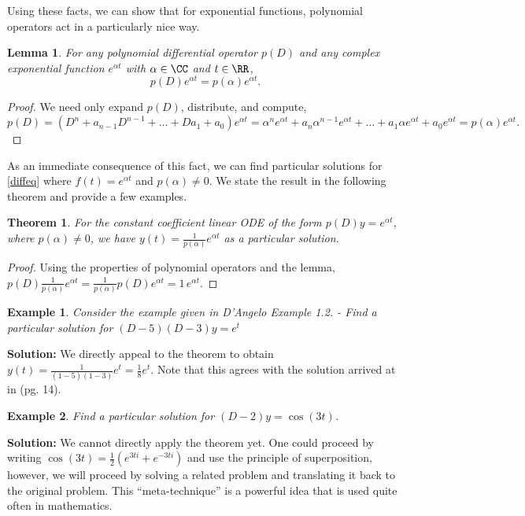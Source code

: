\documentclass{homework} %
\newtheorem{lemma}{Lemma}
\newtheorem{thm}{Theorem}
\newtheorem{ex}{Example}
\begin{document}
Using these facts, we can show that for exponential functions, polynomial operators act in a particularly nice way.
\begin{lemma}
  For any polynomial differential operator $p(D)$ and any complex exponential function $e^{\alpha t}$ with $\alpha \in \CC$ and $t \in \RR$, 
  $$
  p(D) e^{\alpha t} = p(\alpha) e^{\alpha t}.
  $$
\end{lemma}
\begin{proof}
  We need only expand $p(D)$, distribute, and compute,
  $$
    p(D) = (D^n + a_{n-1}D^{n-1} + \dots + Da_1 + a_0) e^{\alpha t} = \alpha^n e^{\alpha t} + a_n \alpha^{n-1} e^{\alpha t} + \dots + a_1 \alpha e^{\alpha t} + a_0 e^{\alpha t} = p(\alpha) e^{\alpha t}.
  $$
\end{proof}

As an immediate consequence of this fact, we can find particular solutions for \eqref{diffeq} where $f(t) = e^{\alpha t}$ and $p(\alpha) \not=0$.  We state the result in the following theorem and provide a few examples.

\begin{thm}
  For the constant coefficient linear ODE of the form $p(D) y = e^{\alpha t}$, where $p(\alpha) \not=0$, we have $y(t) = \frac{1}{p(\alpha)} e^{\alpha t}$ as a particular solution.
\end{thm}
\begin{proof}
  Using the properties of polynomial operators and the lemma, $p(D) \frac{1}{p(\alpha)} e^{\alpha t} = \frac{1}{p(\alpha)} p(D) e^{\alpha t} = 1 \, e^{\alpha t}$.
\end{proof}

\begin{ex} 
  Consider the example given in \emph{D'Angelo Example 1.2.} - Find a particular solution for $(D-5)(D-3)y = e^t$
\end{ex}
{\bf Solution:}
  We directly appeal to the theorem to obtain $y(t) = \frac{1}{(1-5)(1-3)} e^{t} = \frac 18 e^t$. Note that this agrees with the solution arrived at in \cite{dangelo} (pg. 14). 

\begin{ex}
  Find a particular solution for $(D - 2) y = \cos(3t)$.
\end{ex}
{\bf Solution:}
We cannot directly apply the theorem yet.  One could proceed by writing
$\cos(3t) = \frac 12 (e^{3ti} + e^{-3ti})$ and use the principle of
superposition, however, we will proceed by solving a related problem and translating it back to the original problem.  This ``meta-technique'' is a powerful idea that is used quite often in mathematics.
\end{document}
